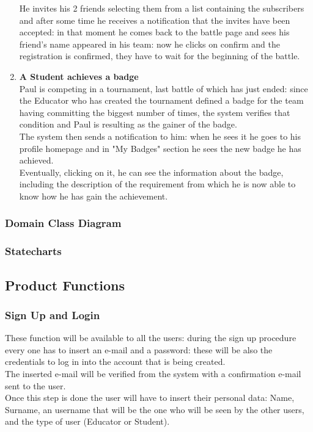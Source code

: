\documentclass{article}
\begin{document}
\begin{enumerate}
  He invites his 2 friends selecting them from a list containing the subscribers and after some time he receives a notification that the invites have been accepted: in that moment he comes back to the battle page and sees his friend's name 
  appeared in his team: now he clicks on confirm and the registration is confirmed, they have to wait for the beginning of the battle.
  \newpage 
  \item \textbf{A Student achieves a badge\\} Paul is competing in a tournament, last battle of which has just ended: since the Educator who has created the tournament defined a badge for the team 
  having committing the biggest number of times, the system verifies that condition and Paul is resulting as the gainer of the badge.\\
  The system then sends a notification to him: when he sees it he goes to his profile homepage and in "My Badges" section he sees the new badge he has achieved.\\
  Eventually, clicking on it, he can see the information about the badge, including the description of the requirement from which he is now able to know
  how he has gain the achievement.


\end{enumerate}

\subsubsection{Domain Class Diagram}
\subsubsection{Statecharts}
\subsection{Product Functions}
\subsubsection{Sign Up and Login}
These function will be available to all the users: during the sign up procedure every one has to insert an e-mail and a password: these will be also the credentials to log in into the account that is being created.\\
The inserted e-mail will be verified from the system with a confirmation e-mail sent to the user.\\
Once this step is done the user will have to insert their personal data: Name, Surname, an username that will be the one who will be seen by the other users, and the type of user (Educator or Student).
\end{document}
